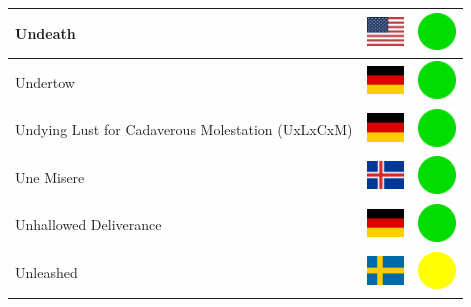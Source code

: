 \documentclass[12pt, a4paper, twoside]{report}
\begin{document}
\begin{center}
\begin{longtable}{|p{5cm}|p{2cm}|p{2cm}|}
 Undeath                                                    & \includegraphics[width=1cm]{../img/flags/us} &   \includegraphics[width=1cm]{../likes/y} \\ \hline
 Undertow                                                   & \includegraphics[width=1cm]{../img/flags/de} &   \includegraphics[width=1cm]{../likes/y} \\ \hline
 Undying Lust for Cadaverous Molestation (UxLxCxM)          & \includegraphics[width=1cm]{../img/flags/de} &   \includegraphics[width=1cm]{../likes/y} \\ \hline
 Une Misere                                                 & \includegraphics[width=1cm]{../img/flags/is} &   \includegraphics[width=1cm]{../likes/y} \\ \hline
 Unhallowed Deliverance                                     & \includegraphics[width=1cm]{../img/flags/de} &   \includegraphics[width=1cm]{../likes/y} \\ \hline
 Unleashed                                                  & \includegraphics[width=1cm]{../img/flags/se} &   \includegraphics[width=1cm]{../likes/m} \\ \hline

\end{longtable}
\end{center}
\end{document}
